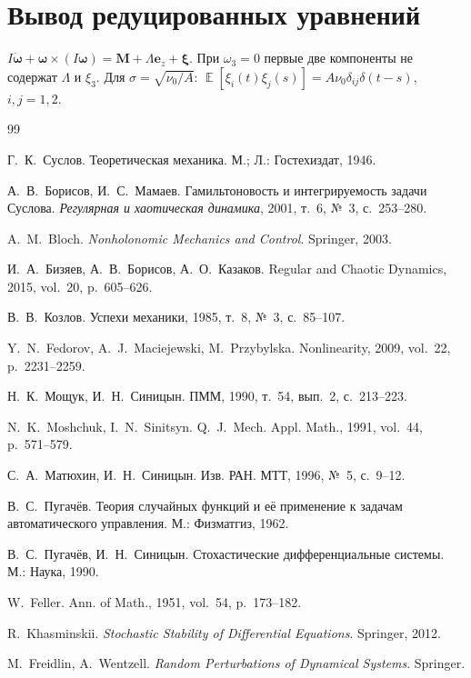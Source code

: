 \documentclass[12pt,a4paper]{article}
\DeclareMathOperator{\E}{\mathbb{E}}
\newcommand{\nuz}{\nu_0}
\begin{document}
\section{Вывод редуцированных уравнений}

$I\dot{\bm\omega}+\bm\omega\times(I\bm\omega)=\bm M+\Lambda\bm e_z+\bm\xi$.
При $\omega_3=0$ первые две компоненты не содержат $\Lambda$ и $\xi_3$.
Для $\sigma=\sqrt{\nuz/A}$: $\E[\xi_i(t)\xi_j(s)]=A\nuz\delta_{ij}\delta(t-s)$, $i,j=1,2$.

\begin{thebibliography}{99}

Г.~К.~Суслов.
\newblock Теоретическая механика.
\newblock М.; Л.: Гостехиздат, 1946.

А.~В.~Борисов, И.~С.~Мамаев.
\newblock Гамильтоновость и интегрируемость задачи Суслова.
\newblock \emph{Регулярная и хаотическая динамика}, 2001, т.~6, №~3, с.~253--280.

A.~M.~Bloch.
\newblock \emph{Nonholonomic Mechanics and Control}.
\newblock Springer, 2003.

И.~А.~Бизяев, А.~В.~Борисов, А.~О.~Казаков.
\newblock Regular and Chaotic Dynamics, 2015, vol.~20, p.~605--626.

В.~В.~Козлов.
\newblock Успехи механики, 1985, т.~8, №~3, с.~85--107.

Y.~N.~Fedorov, A.~J.~Maciejewski, M.~Przybylska.
\newblock Nonlinearity, 2009, vol.~22, p.~2231--2259.

Н.~К.~Мощук, И.~Н.~Синицын.
\newblock ПММ, 1990, т.~54, вып.~2, с.~213--223.

N.~K.~Moshchuk, I.~N.~Sinitsyn.
\newblock Q.~J.~Mech. Appl. Math., 1991, vol.~44, p.~571--579.

С.~А.~Матюхин, И.~Н.~Синицын.
\newblock Изв. РАН. МТТ, 1996, №~5, с.~9--12.

В.~С.~Пугачёв.
\newblock Теория случайных функций и её применение к задачам автоматического управления.
\newblock М.: Физматгиз, 1962.

В.~С.~Пугачёв, И.~Н.~Синицын.
\newblock Стохастические дифференциальные системы.
\newblock М.: Наука, 1990.

W.~Feller.
\newblock Ann. of Math., 1951, vol.~54, p.~173--182.

R.~Khasminskii.
\newblock \emph{Stochastic Stability of Differential Equations}.
\newblock Springer, 2012.

M.~Freidlin, A.~Wentzell.
\newblock \emph{Random Perturbations of Dynamical Systems}.
\newblock Springer.

\end{thebibliography}
\end{document}
